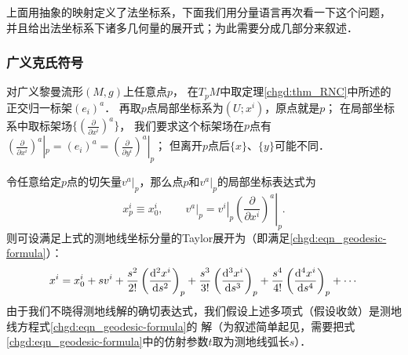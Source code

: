 



上面用抽象的映射定义了法坐标系，下面我们用分量语言再次看一下这个问题，
并且给出法坐标系下诸多几何量的展开式；为此需要分成几部分来叙述．

\subsubsection{广义克氏符号}
对广义黎曼流形$(M,g)$上任意点$p$，
在$T_pM$中取定理\ref{chgd:thm_RNC}中所述的正交归一标架$(e_i)^a$．
再取$p$点局部坐标系为$(U;x^i)$，原点就是$p$；
在局部坐标系中取标架场$\{(\frac{\partial}{\partial x^i})^a\}$，
我们要求这个标架场在$p$点有$(\frac{\partial}{\partial x^i})^a|_p =(e_i)^a
=(\frac{\partial}{\partial y^i})^a|_p $；
但离开$p$点后$\{x\}$、$\{y\}$可能不同．


令任意给定$p$点的切矢量$v^a|_{p}$，那么点$p$和$v^a|_{p}$的局部坐标表达式为
\begin{equation}
    x_p^i\equiv x^i_0, \qquad v^a|_{p} = \left. v^i \right|_{p}
    \left. \left(\frac{\partial}{\partial x^i}\right)^a \right|_{p}.
\end{equation}
则可设满足上式的测地线坐标分量的Taylor展开为（即满足\eqref{chgd:eqn_geodesic-formula}）：
\begin{equation}\label{chgd:eqn_tmpgeodesic-expand}
    x^i = x^i_0 + s v^i  + \frac{s^2}{2!} \left(\frac{{\rm d}^2x^i}{{\rm d} s^2}\right)_{p}
     + \frac{s^3}{3!} \left(\frac{{\rm d}^3 x^i}{{\rm d} s^3}\right)_{p}
     + \frac{s^4}{4!} \left(\frac{{\rm d}^4 x^i}{{\rm d} s^4}\right)_{p}  + \cdots
\end{equation}
由于我们不晓得测地线解的确切表达式，我们假设上述多项式（假设收敛）是测地线方程式\eqref{chgd:eqn_geodesic-formula}的
解（为叙述简单起见，需要把式\eqref{chgd:eqn_geodesic-formula}中的仿射参数$t$取为测地线弧长$s$）．

